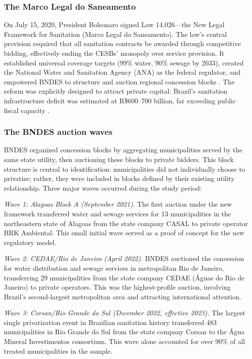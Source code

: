 \documentclass[12pt]{article}
\begin{document}
\subsubsection*{The Marco Legal do Saneamento} On July 15, 2020, President Bolsonaro signed Law 14,026---the New Legal Framework for Sanitation (Marco Legal do Saneamento). The law's central provision required that all sanitation contracts be awarded through competitive bidding, effectively ending the CESBs' monopoly over service provision. It established universal coverage targets (99\% water, 90\% sewage by 2033), created the National Water and Sanitation Agency (ANA) as the federal regulator, and empowered BNDES to structure and auction regional concession blocks \citep{brazil2020law14026}. The reform was explicitly designed to attract private capital: Brazil's sanitation infrastructure deficit was estimated at R\$600--700 billion, far exceeding public fiscal capacity \citep{abespa2021}.

\subsubsection*{The BNDES auction waves} BNDES organized concession blocks by aggregating municipalities served by the same state utility, then auctioning these blocks to private bidders. This block structure is central to identification: municipalities did not individually choose to privatize; rather, they were included in blocks defined by their existing utility relationship. Three major waves occurred during the study period:

\textit{Wave 1: Alagoas Block A (September 2021).} The first auction under the new framework transferred water and sewage services for 13 municipalities in the northeastern state of Alagoas from the state company CASAL to private operator BRK Ambiental. This small initial wave served as a proof of concept for the new regulatory model.

\textit{Wave 2: CEDAE/Rio de Janeiro (April 2022).} BNDES auctioned the concession for water distribution and sewage services in metropolitan Rio de Janeiro, transferring 29 municipalities from the state company CEDAE (\'{A}guas do Rio de Janeiro) to private operators. This was the highest-profile auction, involving Brazil's second-largest metropolitan area and attracting international attention.

\textit{Wave 3: Corsan/Rio Grande do Sul (December 2022, effective 2023).} The largest single privatization event in Brazilian sanitation history transferred 483 municipalities in Rio Grande do Sul from the state company Corsan to the \'{A}gua Mineral Investimentos consortium. This wave alone accounted for over 90\% of all treated municipalities in the sample.
\end{document}
